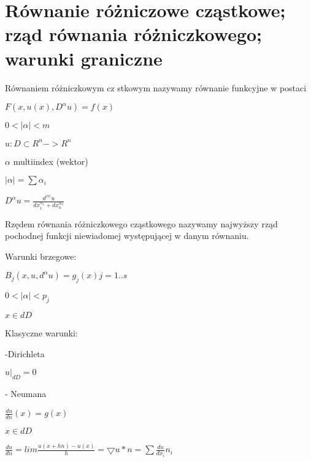\section{Równanie różniczowe cząstkowe; rząd równania różniczkowego; warunki graniczne}
Równaniem różniczkowym cz
stkowym nazywamy równanie funkcyjne w postaci

$F(x ,u(x) , D^\alpha u) = f(x)$

$0<|\alpha| < m$

$u:D \subset R^n -> R^n$

$\alpha$ multiindex (wektor)

$|\alpha| = \sum \alpha_i$

$D^\alpha u = \frac{d^{|\alpha|} u}{dx_1^{\alpha_1} + dx_n^{\alpha_n}}$


Rzędem równania różniczkowego cząstkowego nazywamy najwyższy rząd pochodnej funkcji niewiadomej występującej w danym równaniu. 

Warunki brzegowe:

$ B_j(x,u,d^\alpha u) = g_j(x) j=1 .. s $

$ 0 < |\alpha| < p_j$

$x \in dD$

Klasyczne warunki:

-Dirichleta

$ u|_{dD} =0$

- Neumana

$ \frac{du}{dn}(x) = g(x) $

$x \in dD$

$ \frac{du}{dn} = lim \frac{u(x + hn) - u(x)}{h} = \bigtriangledown u * n = \sum \frac{du}{dx_i}n_i $
